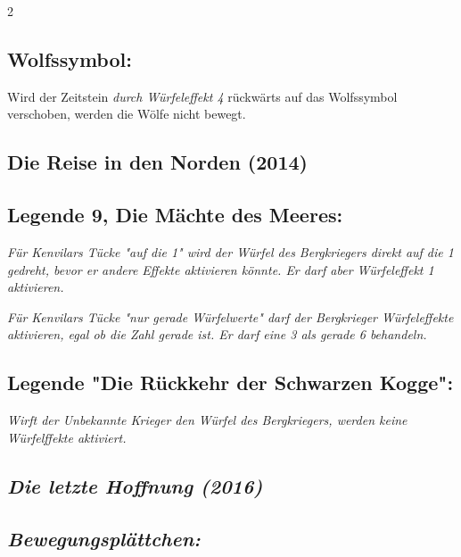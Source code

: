 \documentclass[10pt, a4paper, oneside]{book}
\newcommand{\fan}[1]{\textit{#1}}
\begin{document}
\begin{multicols*}{2}
\begin{bgcolor}
\subsection{Wolfssymbol:}

Wird der Zeitstein \fan{durch Würfeleffekt 4} rückwärts auf das Wolfssymbol verschoben, werden die Wölfe nicht bewegt.
\supercite{stsch-begleitheft}

\end{bgcolor}





\columnbreak


\begin{bgcolor}
\section{Die Reise in den Norden (2014)}

\subsection{Legende 9, Die Mächte des Meeres:}

\fan{Für Kenvilars Tücke "auf die 1" wird der Würfel des Bergkriegers direkt auf die 1 gedreht, bevor er andere Effekte aktivieren könnte. Er darf aber Würfeleffekt 1 aktivieren.}

\fan{Für Kenvilars Tücke "nur gerade Würfelwerte" darf der Bergkrieger Würfeleffekte aktivieren, egal ob die Zahl gerade ist. Er darf eine 3 als gerade 6 behandeln.}


\subsection{Legende "Die Rückkehr der Schwarzen Kogge":}

\fan{Wirft der Unbekannte Krieger den Würfel des Bergkriegers, werden keine Würfelffekte aktiviert.}

\end{bgcolor}


\begin{bgcolor}
\section{\fan{Die letzte Hoffnung (2016)}}

\subsection{\fan{Bewegungsplättchen:}}


\end{bgcolor}
\end{multicols*}
\end{document}
